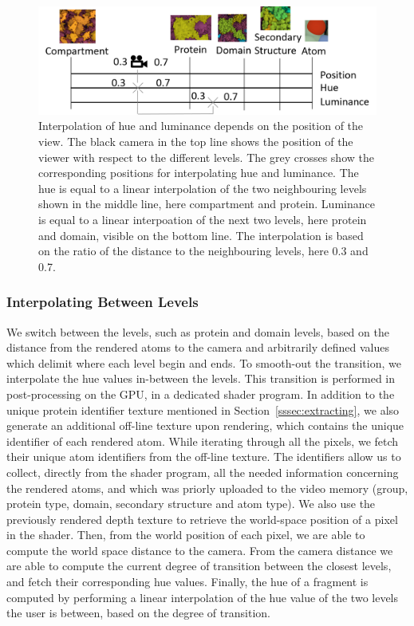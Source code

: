 \documentclass[review,journal]{vgtc}         %
\begin{document}
	\begin{figure}
		\centering
		\includegraphics[width=1\linewidth]{Figures/zoomfigure}
		\caption{Interpolation of hue and luminance depends on the position of the view. The black camera in the top line shows the position of the viewer with respect to the different levels. The grey crosses show the corresponding positions for interpolating hue and luminance.
		The hue is equal to a linear interpolation of the two neighbouring levels shown in the middle line, here compartment and protein. Luminance is equal to a linear interpoation of the next two levels, here protein and domain, visible on the bottom line. The interpolation is based on the ratio of the distance to the neighbouring levels, here 0.3 and 0.7. }
		\label{fig:zoom_continuum}
	\end{figure}
	
	\subsubsection{Interpolating Between Levels}
	
	We switch between the levels, such as protein and domain levels, based on the distance from the rendered atoms to the camera and arbitrarily defined values which delimit where each level begin and ends.
	To smooth-out the transition, we interpolate the hue values in-between the levels.	
	This transition is performed in post-processing on the GPU, in a dedicated shader program.
	In addition to the unique protein identifier texture mentioned in Section~\ref{sssec:extracting}, we also generate an additional off-line texture upon rendering, which contains the unique identifier of each rendered atom.
	While iterating through all the pixels, we fetch their unique atom identifiers from the off-line texture.
	The identifiers allow us to collect, directly from the shader program, all the needed information concerning the rendered atoms, and which was priorly uploaded to the video memory (group, protein type, domain, secondary structure and atom type).	
	We also use the previously rendered depth texture to retrieve the world-space position of a pixel in the shader.
	Then, from the world position of each pixel, we are able to compute the world space distance to the camera.
	From the camera distance we are able to compute the current degree of transition between the closest levels, and fetch their corresponding hue values.	
	Finally, the hue of a fragment is computed by performing a linear interpolation of the hue value of the two levels the user is between, based on the degree of transition.
	
\end{document}
